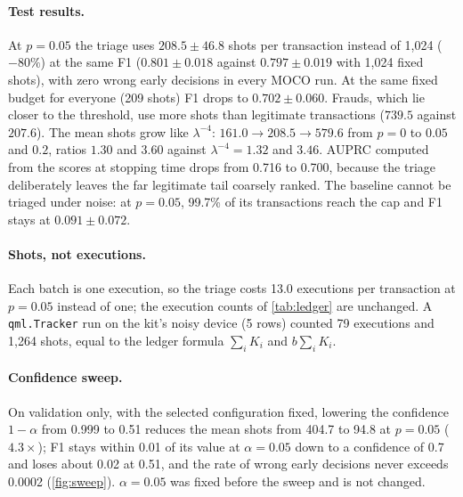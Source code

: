 \documentclass[10pt,twocolumn]{article}
\theoremstyle{definition}
\begin{document}
\paragraph{Test results.} At $p=0.05$ the triage uses $208.5\pm46.8$ shots per transaction instead of 1,024
($-80\%$) at the same F1 ($0.801\pm0.018$ against $0.797\pm0.019$ with 1,024 fixed shots), with zero wrong early
decisions in every MOCO run. At the same fixed budget for everyone (209 shots) F1 drops to $0.702\pm0.060$. Frauds,
which lie closer to the threshold, use more shots than legitimate transactions ($739.5$ against $207.6$). The
mean shots grow like $\lambda^{-4}$: $161.0\to208.5\to579.6$ from $p=0$ to $0.05$ and $0.2$, ratios $1.30$ and
$3.60$ against $\lambda^{-4}=1.32$ and $3.46$. AUPRC computed from the scores at stopping time drops from 0.716 to
0.700, because the triage deliberately leaves the far legitimate tail coarsely ranked. The baseline cannot be
triaged under noise: at $p=0.05$, 99.7\% of its transactions reach the cap and F1 stays at $0.091\pm0.072$.

\paragraph{Shots, not executions.} Each batch is one execution, so the triage costs 13.0 executions per
transaction at $p=0.05$ instead of one; the execution counts of \cref{tab:ledger} are unchanged. A
\texttt{qml.Tracker} run on the kit's noisy device (5 rows) counted 79 executions and 1,264 shots, equal to the
ledger formula $\sum_iK_i$ and $b\sum_iK_i$.

\paragraph{Confidence sweep.} On validation only, with the selected configuration fixed, lowering the confidence
$1-\alpha$ from 0.999 to 0.51 reduces the mean shots from 404.7 to 94.8 at $p=0.05$ ($4.3\times$); F1 stays within
0.01 of its value at $\alpha=0.05$ down to a confidence of 0.7 and loses about 0.02 at 0.51, and the rate of wrong
early decisions never exceeds 0.0002 (\cref{fig:sweep}). $\alpha=0.05$ was fixed before the sweep and is not changed.
\end{document}
